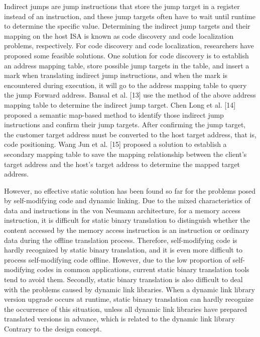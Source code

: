 Indirect jumps are jump instructions that store the jump target in a register instead of an instruction, and these jump targets often have to wait until runtime to determine the specific value.
Determining the indirect jump targets and their mapping on the host ISA is known as code discovery and code localization problems, respectively. 
For code discovery and code localization, researchers have proposed some feasible solutions. 
One solution for code discovery is to establish an address mapping table, store possible jump targets in the table, and insert a mark when translating indirect jump instructions, and when the mark is encountered during execution, it will go to the address mapping table to query the jump Forward address.
Bansal et al. [13] use the method of the above address mapping table to determine the indirect jump target.
Chen Long et al. [14] proposed a semantic map-based method to identify those indirect jump instructions and confirm their jump targets.
After confirming the jump target, the customer target address must be converted to the host target address, that is, code positioning.
Wang Jun et al. [15] proposed a solution to establish a secondary mapping table to save the mapping relationship between the client's target address and the host's target address to determine the mapped target address.

However, no effective static solution has been found so far for the problems posed by self-modifying code and dynamic linking.
Due to the mixed characteristics of data and instructions in the von Neumann architecture, for a memory access instruction, it is difficult for static binary translation to distinguish whether the content accessed by the memory access instruction is an instruction or ordinary data during the offline translation process.
Therefore, self-modifying code is hardly recognized by static binary translation, and it is even more difficult to process self-modifying code offline.
However, due to the low proportion of self-modifying codes in common applications, current static binary translation tools tend to avoid them.
Secondly, static binary translation is also difficult to deal with the problems caused by dynamic link libraries.
When a dynamic link library version upgrade occurs at runtime, static binary translation can hardly recognize the occurrence of this situation, unless all dynamic link libraries have prepared translated versions in advance, which is related to the dynamic link library Contrary to the design concept.

